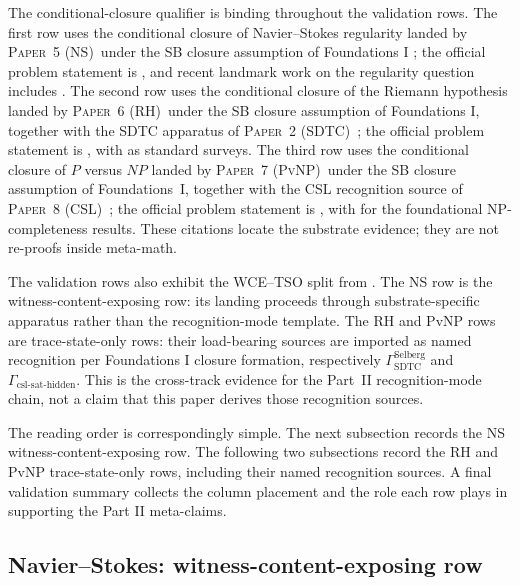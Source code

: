 \documentclass[11pt]{article}
\newcommand{\PaperSDTC}{\textsc{Paper~2 (SDTC)}}
\newcommand{\PaperNS}{\textsc{Paper~5 (NS)}}
\newcommand{\PaperRH}{\textsc{Paper~6 (RH)}}
\newcommand{\PaperPvNP}{\textsc{Paper~7 (PvNP)}}
\newcommand{\PaperCSL}{\textsc{Paper~8 (CSL)}}
\theoremstyle{definition}
\begin{document}
The conditional-closure qualifier is binding throughout the validation
rows. The first row uses the conditional closure of Navier--Stokes
regularity landed by \PaperNS\ under the SB closure assumption of
Foundations I \cite{Tsiokos2026EmergenceCalculus,Tsiokos2026NavierStokes};
the official problem statement is \cite{Fefferman2000NavierStokes},
and recent landmark work on the regularity question includes
\cite{Tao2016NSAveragedBlowup,BuckmasterVicol2019NS}.
The second row uses the
conditional closure of the Riemann hypothesis landed by \PaperRH\ under
the SB closure assumption of Foundations I, together with the SDTC
apparatus of \PaperSDTC\ \cite{Tsiokos2026RH,Tsiokos2026SDTC}; the
official problem statement is \cite{Bombieri2000Riemann}, with
\cite{Conrey2003RH,IwaniecKowalski2004ANT} as standard surveys.
The third row uses the conditional closure of \(P\) versus \(NP\)
landed by \PaperPvNP\ under the SB closure assumption of Foundations~I,
together with the CSL recognition source of \PaperCSL\
\cite{Tsiokos2026PvNP,Tsiokos2026CSL}; the official problem statement
is \cite{Cook2000PvsNP}, with
\cite{Cook1971NPCompleteness,Karp1972NPComplete21} for the foundational
{NP}-completeness results. These citations locate the
substrate evidence; they are not re-proofs inside meta-math.

The validation rows also exhibit the WCE--TSO split from
. The NS row is the
witness-content-exposing row: its landing proceeds through
substrate-specific apparatus rather than the recognition-mode template.
The RH and PvNP rows are trace-state-only rows: their load-bearing sources
are imported as named recognition per Foundations I closure formation,
respectively \(\Gamma_{\text{SDTC}}^{\text{Selberg}}\) and
\(\Gamma_{\text{csl-sat-hidden}}\). This is the cross-track evidence for
the Part~II recognition-mode chain, not a claim that this paper
derives those recognition sources.

The reading order is correspondingly simple. The next subsection records
the NS witness-content-exposing row. The following two subsections record
the RH and PvNP trace-state-only rows, including their named recognition
sources. A final validation summary collects the column placement and the
role each row plays in supporting the Part II meta-claims.

\subsection{Navier--Stokes: witness-content-exposing row}\label{sec:validation:ns}
\end{document}
